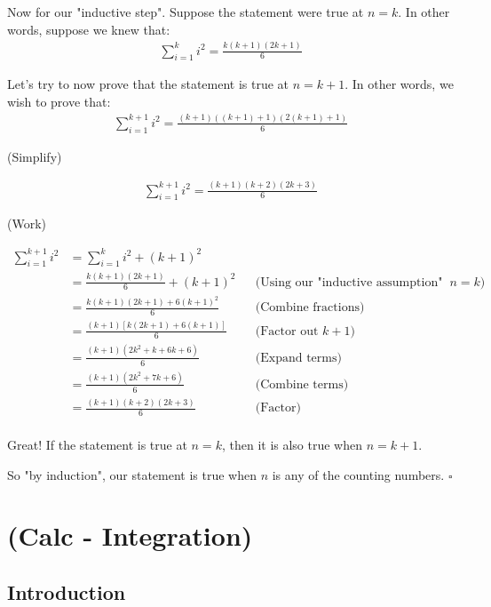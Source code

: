 \documentclass{book}
\begin{document}
Now for our "inductive step". Suppose the statement were true at $n = k$. In other words, suppose we knew that:
\begin{align*}
\sum_{i=1}^{k} i^2 = \frac{k(k+1)(2k+1)}{6}
\end{align*}

Let's try to now prove that the statement is true at $n = k + 1$. In other words, we wish to prove that:
\begin{align*}
\sum_{i=1}^{k+1} i^2 = \frac{(k+1)((k+1)+1)(2(k+1)+1)}{6}
\end{align*}

(Simplify)

\begin{align*}
\sum_{i=1}^{k+1} i^2 = \frac{(k+1)(k+2)(2k+3)}{6}
\end{align*}

(Work)

\begin{align*}
\sum_{i=1}^{k+1} i^2 &= \sum_{i=1}^{k} i^2 + (k+1)^2 \\
&= \frac{k(k+1)(2k+1)}{6} + (k+1)^2 && \text{(Using our "inductive assumption" that the statement is true at $n = k$)} \\
&= \frac{k(k+1)(2k+1) + 6(k+1)^2}{6} && \text{(Combine fractions)} \\
&= \frac{(k+1)\left[k(2k+1) + 6(k+1)\right]}{6} && \text{(Factor out $k+1$)} \\
&= \frac{(k+1)(2k^2 + k + 6k + 6)}{6} && \text{(Expand terms)} \\
&= \frac{(k+1)(2k^2 + 7k + 6)}{6} && \text{(Combine terms)} \\
&= \frac{(k+1)(k+2)(2k+3)}{6} && \text{(Factor)} \\
\end{align*}

Great! If the statement is true at $n = k$, then it is also true when $n = k + 1$. 

So "by induction", our statement is true when $n$ is any of the counting numbers. $\square$



\chapter{(Calc - Integration)}

\section{Introduction}
\end{document}
